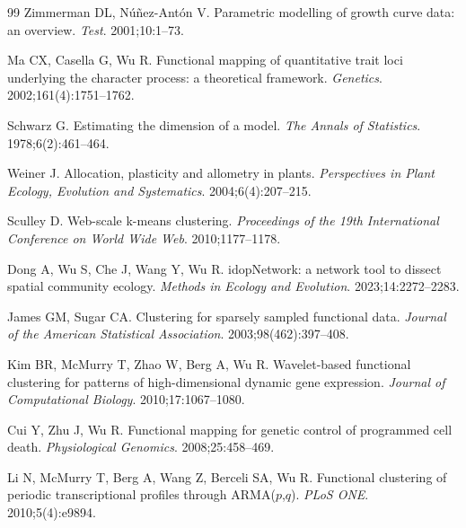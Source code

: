 \documentclass[12pt,a4paper]{article}
\begin{document}
\begin{thebibliography}{99}
Zimmerman DL, N\'{u}\~{n}ez-Ant\'{o}n V. Parametric modelling of growth curve data: an overview. \textit{Test}. 2001;10:1--73.

Ma CX, Casella G, Wu R. Functional mapping of quantitative trait loci underlying the character process: a theoretical framework. \textit{Genetics}. 2002;161(4):1751--1762.

Schwarz G. Estimating the dimension of a model. \textit{The Annals of Statistics}. 1978;6(2):461--464.

Weiner J. Allocation, plasticity and allometry in plants. \textit{Perspectives in Plant Ecology, Evolution and Systematics}. 2004;6(4):207--215.

Sculley D. Web-scale k-means clustering. \textit{Proceedings of the 19th International Conference on World Wide Web}. 2010;1177--1178.

Dong A, Wu S, Che J, Wang Y, Wu R. idopNetwork: a network tool to dissect spatial community ecology. \textit{Methods in Ecology and Evolution}. 2023;14:2272--2283.

James GM, Sugar CA. Clustering for sparsely sampled functional data. \textit{Journal of the American Statistical Association}. 2003;98(462):397--408.

Kim BR, McMurry T, Zhao W, Berg A, Wu R. Wavelet-based functional clustering for patterns of high-dimensional dynamic gene expression. \textit{Journal of Computational Biology}. 2010;17:1067--1080.

Cui Y, Zhu J, Wu R. Functional mapping for genetic control of programmed cell death. \textit{Physiological Genomics}. 2008;25:458--469.

Li N, McMurry T, Berg A, Wang Z, Berceli SA, Wu R. Functional clustering of periodic transcriptional profiles through ARMA($p$,$q$). \textit{PLoS ONE}. 2010;5(4):e9894.

\end{thebibliography}
\end{document}
